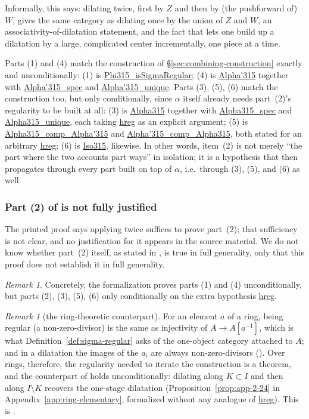 \documentclass[11pt]{amsart}
\newcommand{\lc}[1]{\url{#1}}
\theoremstyle{plain}
\theoremstyle{definition}
\theoremstyle{remark}
\newtheorem{remark}[theorem]{Remark}
\begin{document}
Informally, this says: dilating twice, first by $Z$ and then by (the pushforward of) $W$,
gives the same category as dilating once by the union of $Z$ and $W$, an
associativity-of-dilatation statement, and the fact that lets one build up a dilatation by a
large, complicated center incrementally, one piece at a time.

Parts (1) and (4) match the construction of \S\ref{sec:combining-construction} exactly and
unconditionally: (1) is \lc{Phi315_isSigmaRegular}; (4) is \lc{Alpha'315} together with
\lc{Alpha'315_spec} and \lc{Alpha'315_unique}. Parts (3), (5), (6) match the construction too,
but only conditionally, since $\alpha$ itself already needs part~(2)'s regularity to be
built at all: (3) is \lc{Alpha315} together with \lc{Alpha315_spec} and \lc{Alpha315_unique},
each taking \lc{hreg} as an explicit argument; (5) is \lc{Alpha315_comp_Alpha'315} and
\lc{Alpha'315_comp_Alpha315}, both stated for an arbitrary \lc{hreg}; (6) is \lc{Iso315},
likewise. In other words, item~(2) is not merely ``the part where the two accounts part
ways'' in isolation; it is a hypothesis that then propagates through every part built on
top of $\alpha$, i.e.\ through (3), (5), and (6) as well.

\subsubsection*{Part (2) of \citep[Proposition~3.15]{Mayeux} is not fully justified}

The printed proof says applying \citep[Fact~2.14]{Mayeux} twice suffices to prove part~(2);
that sufficiency is not clear, and no justification for it appears in the source material. We
do not know whether part~(2) itself, as stated in \citep{Mayeux}, is true in full generality,
only that this proof does not establish it in full generality.

\begin{remark}
\label{rem:hreg-honest}
Concretely, the formalization proves parts (1) and (4) unconditionally, but parts (2), (3),
(5), (6) only conditionally on the extra hypothesis \lc{hreg}.
\end{remark}

\begin{remark}[the ring-theoretic counterpart]
\label{rem:rings-counterpart}
For an element $a$ of a ring, being regular (a non-zero-divisor) is the same as injectivity
of $A \to A[a^{-1}]$, which is what Definition~\ref{def:sigma-regular} asks of the one-object
category attached to $A$; and in a dilatation the images of the $a_i$ are always
non-zero-divisors (\citep[Fact~2.10]{M}). Over rings, therefore, the regularity needed to
iterate the construction is a theorem, and the counterpart of
\citep[Proposition~3.15]{Mayeux} holds unconditionally: dilating along $K \subset I$ and then
along $I \setminus K$ recovers the one-stage dilatation
(Proposition~\ref{prop:app-2-24} in Appendix~\ref{app:ring-elementary}, formalized without any
analogue of \lc{hreg}). This is \citep[Proposition~2.24]{M}.
\end{remark}
\end{document}
